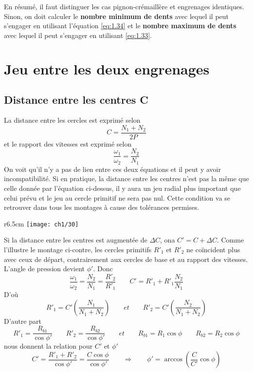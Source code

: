 			En résumé, il faut distinguer les cas pignon-crémaillère et engrenages identiques. Sinon, on doit calculer le \textbf{nombre minimum de dents} avec lequel il peut s'engager en utilisant l'équation \autoref{eq:1.34} et le \textbf{nombre maximum de  dents} avec lequel il peut s'engager en utilisant \autoref{eq:1.33}.
			
\section{Jeu entre les deux engrenages}
	\subsection{Distance entre les centres C}
		La distance entre les cercles est exprimé selon 
		\begin{equation}
			C = \frac{N_1 + N_2}{2P}
		\end{equation}
		et le rapport des vitesses est exprimé selon 
		\begin{equation}
			\frac{\omega _1}{\omega _2} = \frac{N_2}{N_1}
		\end{equation}
		On voit qu'il n'y a pas de lien entre ces deux équations et il peut y avoir incompatibilité. Si en pratique, la distance entre les centres n'est pas la même que celle donnée par l'équation ci-dessus, il y aura un jeu radial plus important que celui prévu et le jeu au cercle primitif ne sera pas nul. Cette condition va se retrouver dans tous les montages à cause des tolérances permises. \\
		
		\begin{wrapfigure}[8]{r}{6.5cm}
		\vspace{-5mm}
		\texttt{[image: ch1/30]}
		\end{wrapfigure}			
		Si la distance entre les centres est augmentée de $\Delta C$, ona $C' = C + \Delta C$. Comme l'illustre le montage ci-contre, les cercles primitifs $R'_1$ et $R'_2$ ne coïncident plus avec ceux de départ, contrairement aux cercles de base et au rapport des vitesses. L'angle de pression devient $\phi '$. Donc 
		\begin{equation}
		\frac{\omega _1}{\omega _2} = \frac{N_2}{N_1} = \frac{R'_2}{R'_1} \qquad C' = R'_1 + R'_1 \frac{N_2}{N_1}
		\end{equation}
		D'où 
		\begin{equation}
			R'_1 = C' \left( \frac{N_1}{N_1+N_2} \right) \qquad et \qquad R'_2 = C' \left( \frac{N_2}{N_1+N_2} \right)
		\end{equation}
		D'autre part 
		\begin{equation}
			R'_1 = \frac{R_{b1}}{\cos \phi '} \qquad 	R'_2 = \frac{R_{b2}}{\cos \phi '} \qquad et \qquad R_{b1} = R_1 \cos \phi \qquad R_{b2} = R_2 \cos \phi
		\end{equation}
		nous donnent la relation pour $C'$ et $\phi '$
		\begin{equation}
			C' = \frac{R'_1+R'_2}{\cos \phi '} = \frac{C \cos \phi}{\cos \phi '} \qquad \Rightarrow \qquad \phi ' = \arccos \left( \frac{C}{C'} \cos \phi \right)
		\end{equation}
		
